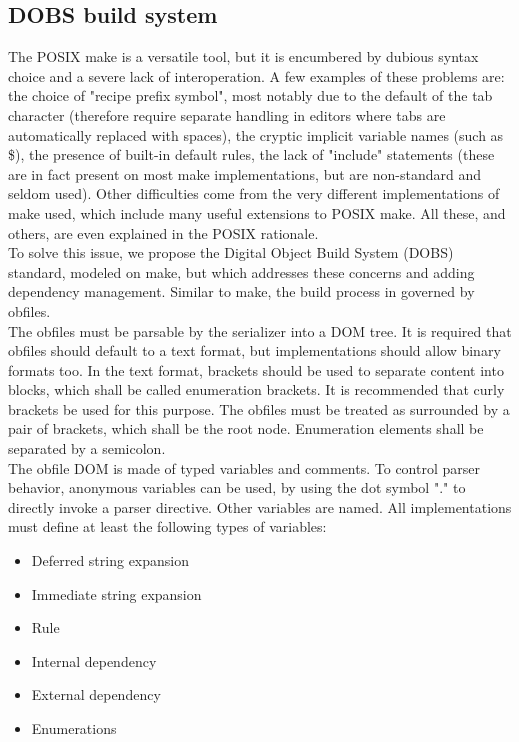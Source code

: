\subsection{DOBS build system}
The POSIX make is a versatile tool, but it is encumbered by dubious syntax choice and a severe lack of interoperation. A few examples of these problems are: the choice of "recipe prefix symbol", most notably due to the default of the tab character (therefore require separate handling in editors where tabs are automatically replaced with spaces), the cryptic implicit variable names (such as \$\@), the presence of built-in default rules, the lack of "include" statements (these are in fact present on most make implementations, but are non-standard and seldom used). Other difficulties come from the very different implementations of make used, which include many useful extensions to POSIX make. All these, and others, are even explained in the POSIX rationale.\\
To solve this issue, we propose the Digital Object Build System (DOBS) standard, modeled on make, but which addresses these concerns and adding dependency management. Similar to make, the build process in governed by obfiles.\\
The obfiles must be parsable by the serializer into a DOM tree. It is required that obfiles should default to a text format, but implementations should allow binary formats too. In the text format, brackets should be used to separate content into blocks, which shall be called enumeration brackets. It is recommended that curly brackets be used for this purpose. The obfiles must be treated as surrounded by a pair of brackets, which shall be the root node. Enumeration elements shall be separated by a semicolon.\\
The obfile DOM is made of typed variables and comments. To control parser behavior, anonymous variables can be used, by using the dot symbol "." to directly invoke a parser directive. Other variables are named. All implementations must define at least the following types of variables:
\begin{itemize}
	\item Deferred string expansion
	\item Immediate string expansion
	\item Rule
	\item Internal dependency
	\item External dependency
	\item Enumerations
\end{itemize}
